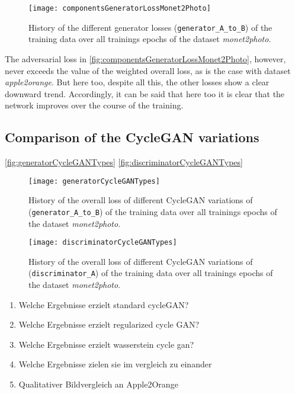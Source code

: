 \documentclass[fleqn,10pt]{SelfArx} %
\begin{document}
\begin{figure}[htb] 
	\centering 
	\texttt{[image: componentsGeneratorLossMonet2Photo]}
	\caption{History of the different generator losses (\texttt{generator\_A\_to\_B}) of the training data over all trainings epochs of the dataset \textit{monet2photo}.}
	\label{fig:componentsGeneratorLossMonet2Photo}
\end{figure}

The adversarial loss in \autoref{fig:componentsGeneratorLossMonet2Photo}, however, never exceeds the value of the weighted overall loss, as is the case with dataset \textit{apple2orange}. But here too, despite all this, the other losses show a clear downward trend. Accordingly, it can be said that here too it is clear that the network improves over the course of the training.

\subsection{Comparison of the Cycle\ac{GAN} variations}
\autoref{fig:generatorCycleGANTypes}
\autoref{fig:discriminatorCycleGANTypes}


\begin{figure}[htb] 
	\centering 
	\texttt{[image: generatorCycleGANTypes]}
	\caption{History of the overall loss of different Cycle\ac{GAN} variations of (\texttt{generator\_A\_to\_B}) of the training data over all trainings epochs of the dataset \textit{monet2photo}.}
	\label{fig:generatorCycleGANTypes}
\end{figure}

\begin{figure}[htb] 
	\centering 
	\texttt{[image: discriminatorCycleGANTypes]}
	\caption{History of the overall loss of different Cycle\ac{GAN} variations of (\texttt{discriminator\_A}) of the training data over all trainings epochs of the dataset \textit{monet2photo}.}
	\label{fig:discriminatorCycleGANTypes}
\end{figure}

\begin{enumerate}[noitemsep] %
	\item Welche Ergebnisse erzielt standard cycleGAN?
	\item Welche Ergebnisse erzielt regularized cycle GAN?
	\item Welche Ergebnisse erzielt wasserstein cycle gan?
	\item Welche Ergebnisse zielen sie im vergleich zu einander
	\item Qualitativer Bildvergleich an Apple2Orange
\end{enumerate}
\end{document}
